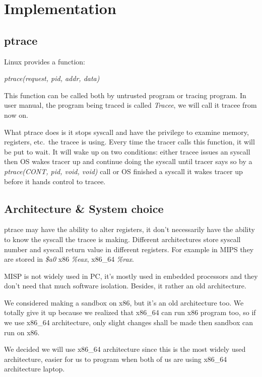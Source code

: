 \documentclass[conference,compsoc]{IEEEtran}
\begin{document}
\section{Implementation}


	\subsection{ptrace}

		\par
			Linux provides a function:\\
				\begin{center}
				\emph{ptrace(request, pid, addr, data)}
				\end{center}
			This function can be called both by untrusted program or tracing program. 
			In user manual, the program being traced is called \emph{Tracee}, we will call it tracee from now on.
		\par 
			What ptrace does is it stops syscall and have the privilege to examine memory, registers, etc.\ the tracee is using. 
			Every time the tracer calls this function, it will be put to wait. 
			It will wake up on two conditions: either tracee issues an syscall then OS wakes tracer up and continue doing the syscall until tracer says so by a \emph{ptrace(CONT, pid, void, void)} call or OS finished a syscall it wakes tracer up before it hands control to tracee.

	\subsection{Architecture \& System choice}

		\par
			ptrace may have the ability to alter registers, it don't necessarily have the ability to know the syscall the tracee is making. 
			Different architectures store syscall number and syscall return value in different registers. 
			For example in MIPS they are stored in \emph{\$a0} x86 \emph{\%eax}, x86\_64 \emph{\%rax}.
		\par
			MISP is not widely used in PC, it's mostly used in embedded processors and they don't need that much software isolation. 
			Besides, it rather an old architecture.
		\par 
			We considered making a sandbox on x86, but it's an old architecture too. 
			We totally give it up because we realized that x86\_64 can run x86 program too, so if we use x86\_64 architecture, only slight changes shall be made then sandbox can run on x86.
		\par 
			We decided we will use x86\_64 architecture since this is the most widely used architecture, easier for us to program when both of us are using x86\_64 architecture laptop.
\end{document}
